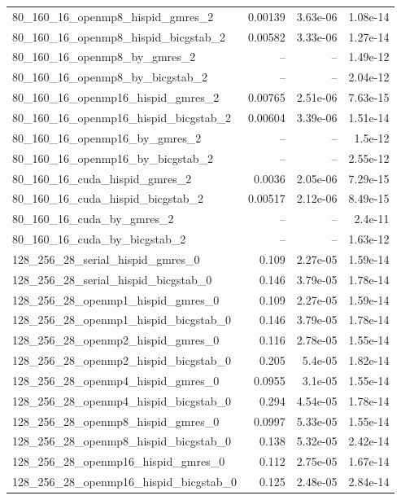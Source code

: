 \documentclass[11pt]{article}
\begin{document}
\begin{longtable}{lrrr}
80\_160\_16\_openmp8\_hispid\_gmres\_2 & 0.00139 & 3.63e-06 & 1.08e-14\\
80\_160\_16\_openmp8\_hispid\_bicgstab\_2 & 0.00582 & 3.33e-06 & 1.27e-14\\
80\_160\_16\_openmp8\_by\_gmres\_2 & -- & -- & 1.49e-12\\
80\_160\_16\_openmp8\_by\_bicgstab\_2 & -- & -- & 2.04e-12\\
80\_160\_16\_openmp16\_hispid\_gmres\_2 & 0.00765 & 2.51e-06 & 7.63e-15\\
80\_160\_16\_openmp16\_hispid\_bicgstab\_2 & 0.00604 & 3.39e-06 & 1.51e-14\\
80\_160\_16\_openmp16\_by\_gmres\_2 & -- & -- & 1.5e-12\\
80\_160\_16\_openmp16\_by\_bicgstab\_2 & -- & -- & 2.55e-12\\
80\_160\_16\_cuda\_hispid\_gmres\_2 & 0.0036 & 2.05e-06 & 7.29e-15\\
80\_160\_16\_cuda\_hispid\_bicgstab\_2 & 0.00517 & 2.12e-06 & 8.49e-15\\
80\_160\_16\_cuda\_by\_gmres\_2 & -- & -- & 2.4e-11\\
80\_160\_16\_cuda\_by\_bicgstab\_2 & -- & -- & 1.63e-12\\
128\_256\_28\_serial\_hispid\_gmres\_0 & 0.109 & 2.27e-05 & 1.59e-14\\
128\_256\_28\_serial\_hispid\_bicgstab\_0 & 0.146 & 3.79e-05 & 1.78e-14\\
128\_256\_28\_openmp1\_hispid\_gmres\_0 & 0.109 & 2.27e-05 & 1.59e-14\\
128\_256\_28\_openmp1\_hispid\_bicgstab\_0 & 0.146 & 3.79e-05 & 1.78e-14\\
128\_256\_28\_openmp2\_hispid\_gmres\_0 & 0.116 & 2.78e-05 & 1.55e-14\\
128\_256\_28\_openmp2\_hispid\_bicgstab\_0 & 0.205 & 5.4e-05 & 1.82e-14\\
128\_256\_28\_openmp4\_hispid\_gmres\_0 & 0.0955 & 3.1e-05 & 1.55e-14\\
128\_256\_28\_openmp4\_hispid\_bicgstab\_0 & 0.294 & 4.54e-05 & 1.78e-14\\
128\_256\_28\_openmp8\_hispid\_gmres\_0 & 0.0997 & 5.33e-05 & 1.55e-14\\
128\_256\_28\_openmp8\_hispid\_bicgstab\_0 & 0.138 & 5.32e-05 & 2.42e-14\\
128\_256\_28\_openmp16\_hispid\_gmres\_0 & 0.112 & 2.75e-05 & 1.67e-14\\
128\_256\_28\_openmp16\_hispid\_bicgstab\_0 & 0.125 & 2.48e-05 & 2.84e-14\\

\end{longtable}
\end{document}
